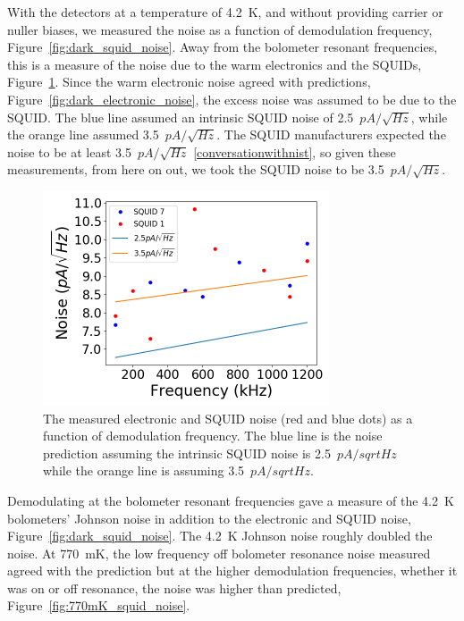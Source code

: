 With the detectors at a temperature of 4.2~K, and without providing carrier or nuller biases, we measured the noise as a function of demodulation frequency, Figure~\ref{fig:dark_squid_noise}. 
Away from the bolometer resonant frequencies, this is a measure of the noise due to the warm electronics and the \ac{SQUID}s, Figure~\ref{fig:adjust_squid}. 
Since the warm electronic noise agreed with predictions, Figure~\ref{fig:dark_electronic_noise}, the excess noise was assumed to be due to the \ac{SQUID}. 
The blue line assumed an intrinsic \ac{SQUID} noise of 2.5~$pA/\sqrt{Hz}$, while the orange line assumed 3.5~$pA/\sqrt{Hz}$.
The \ac{SQUID} manufacturers expected the noise to be at least 3.5~$pA/\sqrt{Hz}$ \ref{conversationwithnist}, so given these measurements, from here on out, we took the \ac{SQUID} noise to be 3.5~$pA/\sqrt{Hz}$.

\begin{figure}[ht!]
\begin{center}
\includegraphics[height=2.5in]{figures/adjusting_squid_noise.png}
\caption{The measured electronic and \ac{SQUID} noise (red and blue dots) as a function of demodulation frequency. The blue line is the noise prediction assuming the intrinsic \ac{SQUID} noise is 2.5~$pA/sqrt{Hz}$ while the orange line is assuming 3.5~$pA/sqrt{Hz}$.  
\label{fig:adjust_squid} }
\end{center}
\end{figure}



Demodulating at the bolometer resonant frequencies gave a measure of the 4.2~K bolometers' Johnson noise in addition to the electronic and \ac{SQUID} noise, Figure~\ref{fig:dark_squid_noise}. 
The 4.2~K Johnson noise roughly doubled the noise.
At 770~mK, the low frequency off bolometer resonance noise measured agreed with the prediction but at the higher demodulation frequencies, whether it was on or off resonance, the noise was higher than predicted, Figure~\ref{fig:770mK_squid_noise}. 


